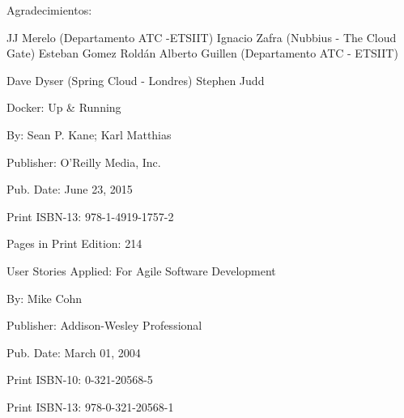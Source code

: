\begin{normalsize}




Agradecimientos:


JJ Merelo (Departamento ATC -ETSIIT)
Ignacio Zafra (Nubbius - The Cloud Gate)
Esteban Gomez Roldán
Alberto Guillen (Departamento ATC - ETSIIT)

Dave Dyser (Spring Cloud - Londres) 
Stephen Judd


\end{normalsize}

Docker: Up & Running

By: Sean P. Kane; Karl Matthias

Publisher: O'Reilly Media, Inc.

Pub. Date: June 23, 2015

Print ISBN-13: 978-1-4919-1757-2

Pages in Print Edition: 214



User Stories Applied: For Agile Software Development

By: Mike Cohn

Publisher: Addison-Wesley Professional

Pub. Date: March 01, 2004

Print ISBN-10: 0-321-20568-5

Print ISBN-13: 978-0-321-20568-1
